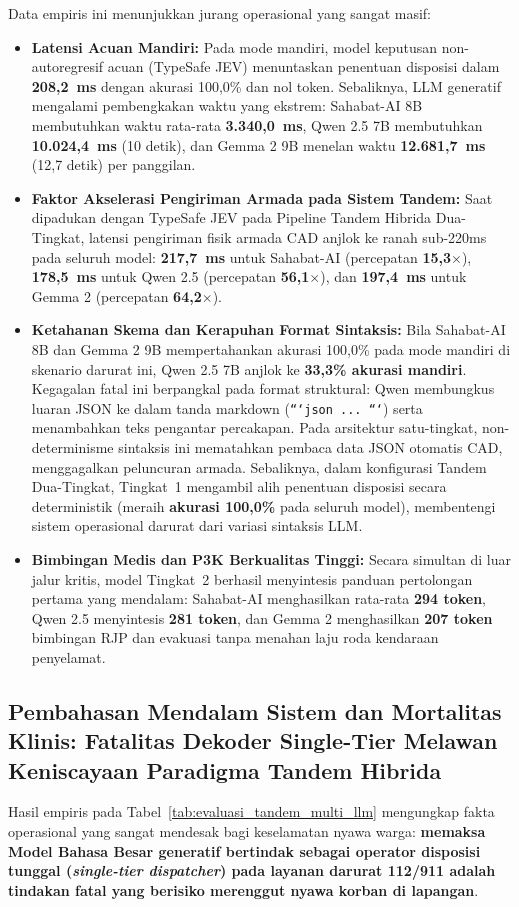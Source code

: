 \documentclass[journal,compsoc]{IEEEtran}
\begin{document}
Data empiris ini menunjukkan jurang operasional yang sangat masif:
\begin{itemize}
    \item \textbf{Latensi Acuan Mandiri:} Pada mode mandiri, model keputusan non-autoregresif acuan (TypeSafe JEV) menuntaskan penentuan disposisi dalam \textbf{208,2~ms} dengan akurasi 100,0\% dan nol token. Sebaliknya, LLM generatif mengalami pembengkakan waktu yang ekstrem: Sahabat-AI 8B membutuhkan waktu rata-rata \textbf{3.340,0~ms}, Qwen 2.5 7B membutuhkan \textbf{10.024,4~ms} (10 detik), dan Gemma 2 9B menelan waktu \textbf{12.681,7~ms} (12,7 detik) per panggilan.
    \item \textbf{Faktor Akselerasi Pengiriman Armada pada Sistem Tandem:} Saat dipadukan dengan TypeSafe JEV pada Pipeline Tandem Hibrida Dua-Tingkat, latensi pengiriman fisik armada CAD anjlok ke ranah sub-220ms pada seluruh model: \textbf{217,7~ms} untuk Sahabat-AI (percepatan \textbf{15,3$\times$}), \textbf{178,5~ms} untuk Qwen 2.5 (percepatan \textbf{56,1$\times$}), dan \textbf{197,4~ms} untuk Gemma 2 (percepatan \textbf{64,2$\times$}).
    \item \textbf{Ketahanan Skema dan Kerapuhan Format Sintaksis:} Bila Sahabat-AI 8B dan Gemma 2 9B mempertahankan akurasi 100,0\% pada mode mandiri di skenario darurat ini, Qwen 2.5 7B anjlok ke \textbf{33,3\% akurasi mandiri}. Kegagalan fatal ini berpangkal pada format struktural: Qwen membungkus luaran JSON ke dalam tanda markdown (\texttt{```json ... ```}) serta menambahkan teks pengantar percakapan. Pada arsitektur satu-tingkat, non-determinisme sintaksis ini mematahkan pembaca data JSON otomatis CAD, menggagalkan peluncuran armada. Sebaliknya, dalam konfigurasi Tandem Dua-Tingkat, Tingkat~1 mengambil alih penentuan disposisi secara deterministik (meraih \textbf{akurasi 100,0\%} pada seluruh model), membentengi sistem operasional darurat dari variasi sintaksis LLM.
    \item \textbf{Bimbingan Medis dan P3K Berkualitas Tinggi:} Secara simultan di luar jalur kritis, model Tingkat~2 berhasil menyintesis panduan pertolongan pertama yang mendalam: Sahabat-AI menghasilkan rata-rata \textbf{294 token}, Qwen 2.5 menyintesis \textbf{281 token}, dan Gemma 2 menghasilkan \textbf{207 token} bimbingan RJP dan evakuasi tanpa menahan laju roda kendaraan penyelamat.
\end{itemize}

\subsection{Pembahasan Mendalam Sistem dan Mortalitas Klinis: Fatalitas Dekoder Single-Tier Melawan Keniscayaan Paradigma Tandem Hibrida}
Hasil empiris pada Tabel~\ref{tab:evaluasi_tandem_multi_llm} mengungkap fakta operasional yang sangat mendesak bagi keselamatan nyawa warga: \textbf{memaksa Model Bahasa Besar generatif bertindak sebagai operator disposisi tunggal (\textit{single-tier dispatcher}) pada layanan darurat 112/911 adalah tindakan fatal yang berisiko merenggut nyawa korban di lapangan}.
\end{document}
